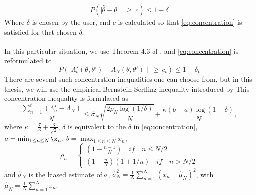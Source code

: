 \begin{equation}\label{eq:concentration}
    P\left(\mid \hat{\theta} - \theta \mid \:\geq \:c\right) \leq 1 - \delta 
\end{equation}
Where $\delta$ is chosen by the user, and $c$ is calculated so that \eqref{eq:concentration} is satisfied for that chosen $\delta$.   \\ \\ 
In this particular situation, we use Theorem 4.3 of \cite{bardenet2015concentration}, and \eqref{eq:concentration} is reformulated to 
\begin{equation*}
    P\left(\mid\Lambda_t^{\star}\left(\theta, \theta'\right) - \Lambda_N\left(\theta, \theta'\right)\mid \: \geq \:c_t \right) \leq 1 - \delta_t  
\end{equation*}{}
There are several such concentration inequalities one can choose from, but in this thesis, we will use the empirical Bernstein-Serfling inequality introduced by \cite{bardenet2015concentration}
This concentration inequality is formulated as 
\begin{equation}\label{eq:BernsteinSerfling}
    \frac{\sum_{n = 1}^t \left(\Lambda^{\star}_n - \Lambda_N \right)}{N} \leq \hat{\sigma}_N \sqrt{\frac{2\rho_N\log\left(1/\delta\right)}{N}} + \frac{\kappa \left(b-a\right)\log\left(1 - \delta\right)}{N},
\end{equation}{}
where $\kappa = \frac{7}{3} + \frac{3}{\sqrt{2}}$, $\delta$ is equivalent to the $\delta$ in \eqref{eq:concentration}, $a = \min_{1\leq n \leq N} \x_n$, $b= \max_{1 \leq n \leq N} x_n$, 
\begin{equation}
    \rho_n =
    \begin{cases}
    \left(1 - \frac{n-1}{N}\right) \quad if \quad n \leq N/2\\
    \left(1  - \frac{n}{N}\right) \left(1 + 1/n\right) \quad if \quad n > N/2
    \end{cases}
\end{equation} and $\hat{\sigma}_N$ is the biased estimate of $\sigma$, $\hat{\sigma}_N^2 = \frac{1}{N}\sum_{n=1}^N \left(x_n - \hat{\mu}_N\right)^2$, with $\hat{\mu}_N = \frac{1}{N}\sum_{n=1}^N x_n$.    





